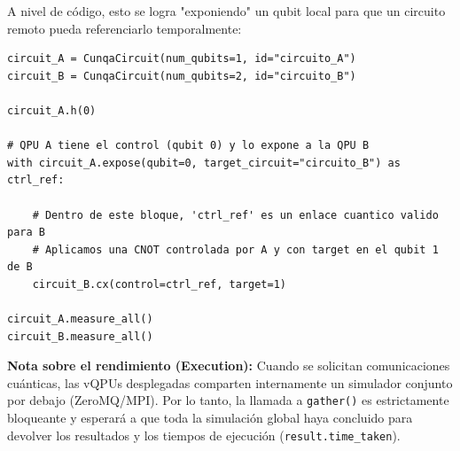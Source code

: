 \documentclass[a4paper,11pt]{article}
\begin{document}
A nivel de código, esto se logra "exponiendo" un qubit local para que un circuito remoto pueda referenciarlo temporalmente:

\begin{lstlisting}[style=pythonstyle, caption=Ejemplo: Puerta CNOT Distribuida (Telegate)]
circuit_A = CunqaCircuit(num_qubits=1, id="circuito_A")
circuit_B = CunqaCircuit(num_qubits=2, id="circuito_B")

circuit_A.h(0)

# QPU A tiene el control (qubit 0) y lo expone a la QPU B
with circuit_A.expose(qubit=0, target_circuit="circuito_B") as ctrl_ref:
    
    # Dentro de este bloque, 'ctrl_ref' es un enlace cuantico valido para B
    # Aplicamos una CNOT controlada por A y con target en el qubit 1 de B
    circuit_B.cx(control=ctrl_ref, target=1)

circuit_A.measure_all()
circuit_B.measure_all()
\end{lstlisting}

\vspace{0.3cm}
\textbf{Nota sobre el rendimiento (Execution):} Cuando se solicitan comunicaciones cuánticas, las vQPUs desplegadas comparten internamente un simulador conjunto por debajo (ZeroMQ/MPI). Por lo tanto, la llamada a \texttt{gather()} es estrictamente bloqueante y esperará a que toda la simulación global haya concluido para devolver los resultados y los tiempos de ejecución (\texttt{result.time\_taken}).




\end{document}

